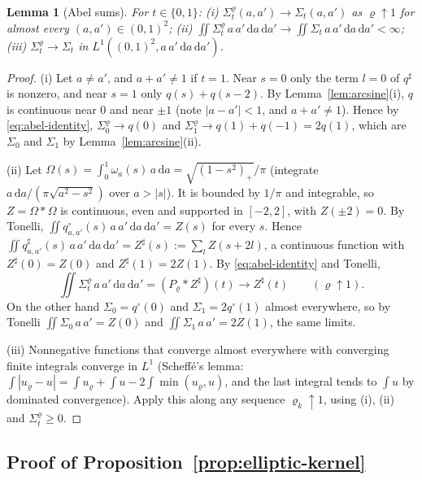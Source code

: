 \documentclass[preprint,12pt,a4paper]{elsarticle}
\newtheorem{lemma}[theorem]{Lemma}
\theoremstyle{remark}
\newcommand{\dd}{\,\mathrm d}
\begin{document}
\begin{lemma}[Abel sums]\label{lem:abel}
For $t\in\{0,1\}$: (i) $\Sigma^\varrho_t(a,a')\to\Sigma_t(a,a')$ as $\varrho\uparrow1$ for
almost every $(a,a')\in(0,1)^2$; (ii) $\iint\Sigma^\varrho_t\,a\,a'\dd a\dd a'\to\iint\Sigma_t\,a\,a'\dd a\dd a'<\infty$;
(iii) $\Sigma_t^\varrho\to\Sigma_t$ in $L^1((0,1)^2,a\,a'\dd a\dd a')$.
\end{lemma}
\begin{proof}
(i) Let $a\ne a'$, and $a+a'\ne1$ if $t=1$. Near $s=0$ only the term $l=0$ of $q^\sharp$ is
nonzero, and near $s=1$ only $q(s)+q(s-2)$. By Lemma~\ref{lem:arcsine}(i), $q$ is
continuous near $0$ and near $\pm1$ (note $|a-a'|<1$, and $a+a'\ne1$). Hence by
\eqref{eq:abel-identity}, $\Sigma^\varrho_0\to q(0)$ and $\Sigma^\varrho_1\to q(1)+q(-1)=2q(1)$,
which are $\Sigma_0$ and $\Sigma_1$ by Lemma~\ref{lem:arcsine}(ii).

(ii) Let $\Omega(s)=\int_0^1\omega_a(s)\,a\dd a=\sqrt{(1-s^2)_+}/\pi$ (integrate
$a\dd a/(\pi\sqrt{a^2-s^2})$ over $a>|s|$). It is bounded by $1/\pi$ and integrable, so
$Z=\Omega*\Omega$ is continuous, even and supported in $[-2,2]$, with $Z(\pm2)=0$. By Tonelli,
$\iint q^\circ_{a,a'}(s)\,a\,a'\dd a\dd a'=Z(s)$ for every $s$. Hence
$\iint q^\sharp_{a,a'}(s)\,a\,a'\dd a\dd a'=Z^\sharp(s):=\sum_lZ(s+2l)$, a continuous function with
$Z^\sharp(0)=Z(0)$ and $Z^\sharp(1)=2Z(1)$. By \eqref{eq:abel-identity} and Tonelli,
\[
 \iint\Sigma^\varrho_t\,a\,a'\dd a\dd a'=(P_\varrho*Z^\sharp)(t)\longrightarrow Z^\sharp(t)\qquad(\varrho\uparrow1).
\]
On the other hand $\Sigma_0=q^\circ(0)$ and $\Sigma_1=2q^\circ(1)$ almost everywhere, so by
Tonelli $\iint\Sigma_0\,a\,a'=Z(0)$ and $\iint\Sigma_1\,a\,a'=2Z(1)$, the same limits.

(iii) Nonnegative functions that converge almost everywhere with converging finite integrals
converge in $L^1$ (Scheffé's lemma: $\int|u_\varrho-u|=\int u_\varrho+\int u-2\int\min(u_\varrho,u)$, and
the last integral tends to $\int u$ by dominated convergence). Apply this along any sequence
$\varrho_k\uparrow1$, using (i), (ii) and $\Sigma_t^\varrho\ge0$.
\end{proof}

\subsection{Proof of Proposition~\ref{prop:elliptic-kernel}}\label{app:elliptic-proof}
\end{document}
